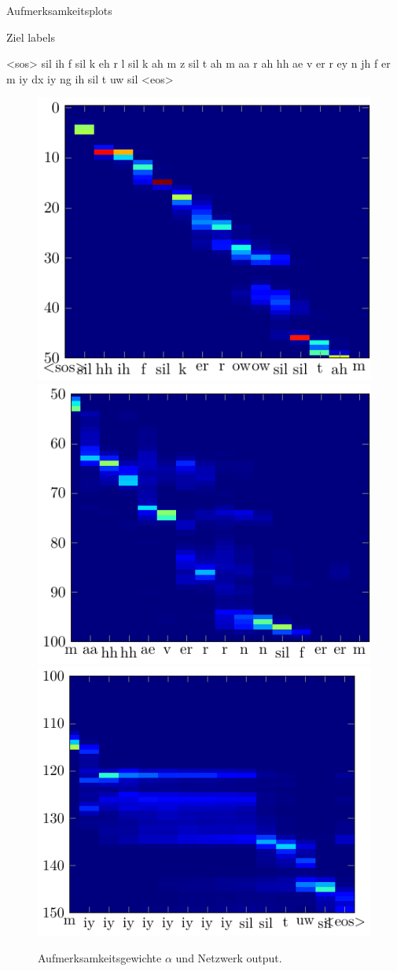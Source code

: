 \documentclass[10pt]{beamer}
\begin{document}
\begin{frame}{Aufmerksamkeitsplots}
	\begin{block}{Ziel labels}
		\begin{semiverbatim}
		<sos>  sil  ih  f  sil  k  eh  r  l  sil  k  ah  m  z
		       sil  t  ah  m  aa  r  ah  hh  ae  v  er  r  ey
		       n  jh  f  er  m  iy  dx  iy  ng  ih
		       sil  t  uw  sil
		<eos>
		\end{semiverbatim}
	\end{block}

	\begin{figure}
	\centering
	\includegraphics[height=0.26\linewidth]{../tikz/alphaZoom}
	\includegraphics[height=0.26\linewidth]{../tikz/alphaZoom2}
	\includegraphics[height=0.26\linewidth]{../tikz/alphaZoom3}
	\caption{Aufmerksamkeitsgewichte $\alpha$ und Netzwerk output.}
	\label{fig:attention3}
	\end{figure}
\end{frame}
\end{document}
